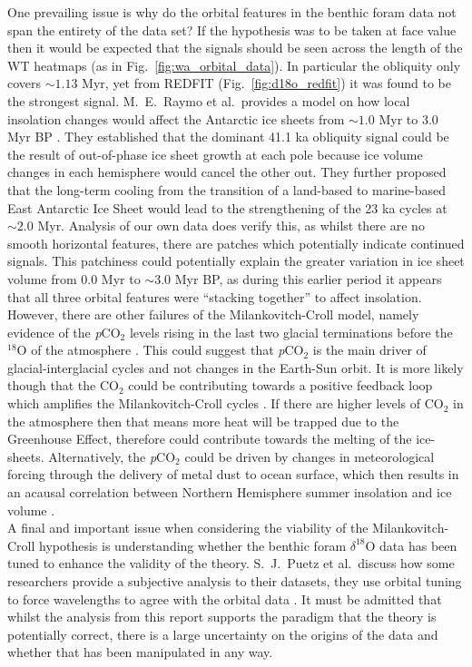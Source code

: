 \documentclass[12pt, onecolumn]{revtex4}    %
\begin{document}
One prevailing issue is why do the orbital features in the benthic foram data not span the entirety of the data set? If the hypothesis was to be taken at face value then it would be expected that the signals should be seen across the length of the WT heatmaps (as in Fig.~\ref{fig:wa_orbital_data}). In particular the obliquity only covers $\sim 1.13$ Myr, yet from REDFIT (Fig.~\ref{fig:d18o_redfit}) it was found to be the strongest signal. M.~E.~Raymo et al.~provides a model on how local insolation changes would affect the Antarctic ice sheets from $\sim 1.0$ Myr to 3.0 Myr BP \cite{raymo_plio}. They established that the dominant 41.1 ka obliquity signal could be the result of out-of-phase ice sheet growth at each pole because ice volume changes in each hemisphere would cancel the other out. They further proposed that the long-term cooling from the transition of a land-based to marine-based East Antarctic Ice Sheet would lead to the strengthening of the 23 ka cycles at $\sim 2.0$ Myr. Analysis of our own data does verify this, as whilst there are no smooth horizontal features, there are patches which potentially indicate continued signals. This patchiness could potentially explain the greater variation in ice sheet volume from 0.0 Myr to $\sim 3.0$ Myr BP, as during this earlier period it appears that all three orbital features were ``stacking together'' to affect insolation. \\ 

However, there are other failures of the Milankovitch-Croll model, namely evidence of the \textit{p}CO$_{2}$ levels rising in the last two glacial terminations before the $^{18}$O of the atmosphere \cite{sowers_climate, broecker_terminationii}. This could suggest that \textit{p}CO$_{2}$ is the main driver of glacial-interglacial cycles and not changes in the Earth-Sun orbit. It is more likely though that the CO$_{2}$ could be contributing towards a positive feedback loop which amplifies the Milankovitch-Croll cycles \cite{sigman_atmosphere}. If there are higher levels of CO$_{2}$ in the atmosphere then that means more heat will be trapped due to the Greenhouse Effect, therefore could contribute towards the melting of the ice-sheets. Alternatively, the \textit{p}CO$_{2}$ could be driven by changes in meteorological forcing through the delivery of metal dust to ocean surface, which then results in an acausal correlation between Northern Hemisphere summer insolation and ice volume \cite{archer_pco2}. \\

A final and important issue when considering the viability of the Milankovitch-Croll hypothesis is understanding whether the benthic foram $\delta^{18}$O data has been tuned to enhance the validity of the theory. S.~J.~Puetz et al.~discuss how some researchers provide a subjective analysis to their datasets, they use orbital tuning to force wavelengths to agree with the orbital data \cite{puetz_alternatives}. It must be admitted that whilst the analysis from this report supports the paradigm that the theory is potentially correct, there is a large uncertainty on the origins of the data and whether that has been manipulated in any way. \\
\end{document}
